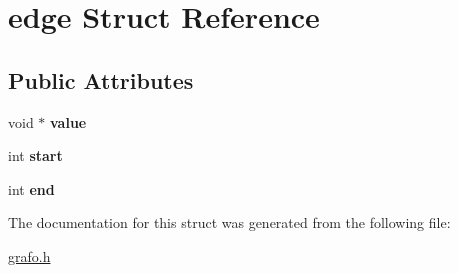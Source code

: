 \hypertarget{structedge}{}\section{edge Struct Reference}
\label{structedge}
\subsection*{Public Attributes}
\begin{DoxyCompactItemize}
\item 
\mbox{\label{structedge_a91c3b14d69d426b3ded39e9ca8d26db7}} 
void $\ast$ {\bfseries value}
\item 
\mbox{\label{structedge_a932f908ef7a7ba5b5221c321cb811f85}} 
int {\bfseries start}
\item 
\mbox{\label{structedge_ac5d4c26a39e285e8de29e2b8e9874d29}} 
int {\bfseries end}
\end{DoxyCompactItemize}


The documentation for this struct was generated from the following file\+:\begin{DoxyCompactItemize}
\item 
\hyperlink{grafo_8h}{grafo.\+h}\end{DoxyCompactItemize}
